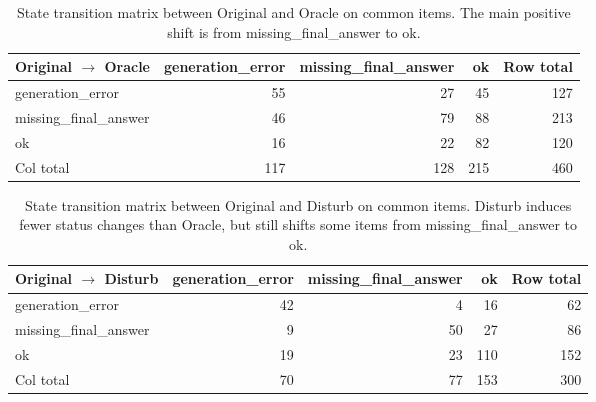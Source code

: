 \begin{table}[t]
\centering
\small
\setlength{\tabcolsep}{5pt}
\begin{tabular}{lrrrr}
\hline
Original $\rightarrow$ Oracle & generation\_error & missing\_final\_answer & ok & Row total \\
\hline
generation\_error & 55 & 27 & 45 & 127 \\
missing\_final\_answer & 46 & 79 & 88 & 213 \\
ok & 16 & 22 & 82 & 120 \\
\hline
Col total & 117 & 128 & 215 & 460 \\
\hline
\end{tabular}
\caption{State transition matrix between Original and Oracle on common items. The main positive shift is from missing\_final\_answer to ok.}
\label{tab:refamb-state-transition-oracle}
\end{table}

\begin{table}[t]
\centering
\small
\setlength{\tabcolsep}{5pt}
\begin{tabular}{lrrrr}
\hline
Original $\rightarrow$ Disturb & generation\_error & missing\_final\_answer & ok & Row total \\
\hline
generation\_error & 42 & 4 & 16 & 62 \\
missing\_final\_answer & 9 & 50 & 27 & 86 \\
ok & 19 & 23 & 110 & 152 \\
\hline
Col total & 70 & 77 & 153 & 300 \\
\hline
\end{tabular}
\caption{State transition matrix between Original and Disturb on common items. Disturb induces fewer status changes than Oracle, but still shifts some items from missing\_final\_answer to ok.}
\label{tab:refamb-state-transition-disturb}
\end{table}

